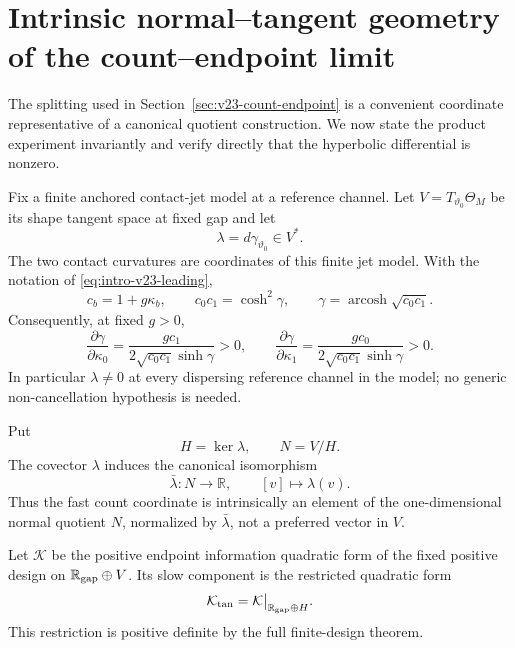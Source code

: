 \section{Intrinsic normal--tangent geometry of the count--endpoint limit}
\label{sec:v24-intrinsic-count-geometry}

The splitting used in Section~\ref{sec:v23-count-endpoint} is a convenient
coordinate representative of a canonical quotient construction.  We now
state the product experiment invariantly and verify directly that the
hyperbolic differential is nonzero.

Fix a finite anchored contact-jet model at a reference channel.  Let
\(V=T_{\vartheta_0}\Theta_M\) be its shape tangent space at fixed gap and let
\begin{equation}\label{eq:v24-hyperbolic-covector}
                         \lambda=d\gamma_{\vartheta_0}\in V^*.
\end{equation}
The two contact curvatures are coordinates of this finite jet model.  With the
notation of \eqref{eq:intro-v23-leading},
\[
 c_b=1+g\kappa_b,
 \qquad c_0c_1=\cosh^2\gamma,
 \qquad
 \gamma=\operatorname{arcosh}\sqrt{c_0c_1}.
\]
Consequently, at fixed \(g>0\),
\begin{equation}\label{eq:v24-gamma-curvature-derivatives}
 \frac{\partial\gamma}{\partial\kappa_0}
 =\frac{g c_1}{2\sqrt{c_0c_1}\sinh\gamma}>0,
 \qquad
 \frac{\partial\gamma}{\partial\kappa_1}
 =\frac{g c_0}{2\sqrt{c_0c_1}\sinh\gamma}>0.
\end{equation}
In particular \(\lambda\ne0\) at every dispersing reference channel in the
model; no generic non-cancellation hypothesis is needed.

Put
\begin{equation}\label{eq:v24-normal-tangent-spaces}
 H=\ker\lambda,
 \qquad N=V/H.
\end{equation}
The covector \(\lambda\) induces the canonical isomorphism
\begin{equation}\label{eq:v24-normal-coordinate}
 \bar\lambda:N\longrightarrow\mathbb R,
 \qquad [v]\longmapsto\lambda(v).
\end{equation}
Thus the fast count coordinate is intrinsically an element of the
one-dimensional normal quotient \(N\), normalized by \(\bar\lambda\), not a
preferred vector in \(V\).

Let \(\mathcal K\) be the positive endpoint information quadratic form of the
fixed positive design on \(\mathbb R_{\rm gap}\oplus V\).  Its slow component
is the restricted quadratic form
\begin{equation}\label{eq:v24-tangent-information}
 \mathcal K_{\rm tan}
 =\mathcal K\big|_{\mathbb R_{\rm gap}\oplus H}.
\end{equation}
This restriction is positive definite by the full finite-design theorem.

